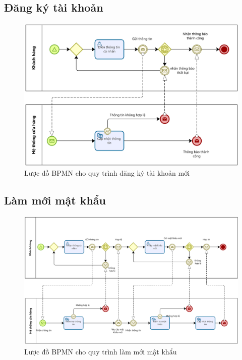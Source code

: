 \subsection{Đăng ký tài khoản}
\begin{figure}[!htp]
    \centering
    \includegraphics[width=14cm]{img/BPMN/Hien/Customer_register.png}
    \newline
    \caption{Lược đồ BPMN cho quy trình đăng ký tài khoản mới}
\end{figure}


\subsection{Làm mới mật khẩu}
\begin{figure}[!htp]
    \centering
    \includegraphics[width=14cm]{img/BPMN/Hien/Customer_resetPassword.png}
    \newline
    \caption{Lược đồ BPMN cho quy trình làm mới mật khẩu}
\end{figure}



